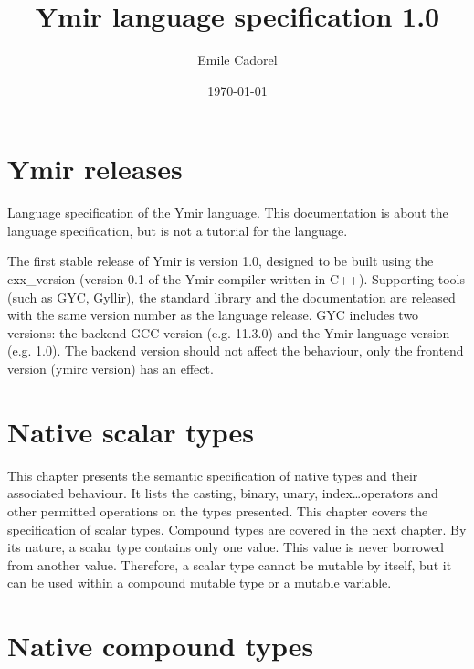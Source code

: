 \documentclass[a4paper,11pt]{book}
\author{Emile Cadorel}
\date{\today}
\title{Ymir language specification 1.0}
\begin{document}

\maketitle
\dominitoc
\dominilof
\dominilot

\chapter*{Ymir releases}

Language specification of the Ymir language. This documentation is about the language specification, but is not a tutorial for the language.


The first stable release of Ymir is version 1.0, designed to be built using the cxx\_version (version 0.1 of the Ymir compiler written in C++). Supporting tools (such as GYC, Gyllir), the standard library and the documentation are released with the same version number as the language release. GYC includes two versions: the backend GCC version (e.g. 11.3.0) and the Ymir language version (e.g. 1.0). The backend version should not affect the behaviour, only the frontend version (ymirc version) has an effect.

\begin{multicols}{2}
  \tableofcontents
\end{multicols}


\chapter{Native scalar types}

This chapter presents the semantic specification of native types and their
associated behaviour. It lists the casting, binary, unary, index\ldots operators
and other permitted operations on the types presented. This chapter covers the
specification of scalar types. Compound types are covered in the next chapter.
By its nature, a scalar type contains only one value. This value is never
borrowed from another value. Therefore, a scalar type cannot be mutable by
itself, but it can be used within a compound mutable type or a mutable variable.

\begin{multicols}{2}
  \minitoc%
  
\end{multicols}

\chapter{Native compound types}
\end{document}
